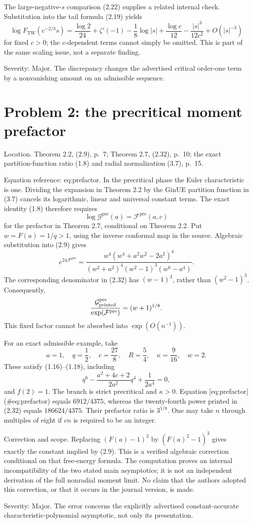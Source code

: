 \documentclass[10pt]{article}
\begin{document}
The large-negative-\(s\) comparison (2.22) supplies a related internal check. Substitution into the tail formula (2.19) yields \[\log F_{\mathrm{TW}}(c^{-2/3}s)
 =\frac{\log2}{24}+\zeta'(-1)-\frac18\log|s|
  +\frac{\log c}{12}-\frac{|s|^3}{12c^2}
  +O(|s|^{-3})\] for fixed \(c>0\); the \(c\)-dependent terms cannot simply be omitted. This is part of the same scaling issue, not a separate finding.\par
Severity: Major. The discrepancy changes the advertised critical order-one term by a nonvanishing amount on an admissible sequence.\par
\section*{Problem 2: the precritical moment prefactor}
Location. Theorem 2.2, (2.9), p. 7; Theorem 2.7, (2.32), p. 10; the exact partition-function ratio (1.8) and radial normalization (3.7), p. 15.\par
Equation reference: eq:prefactor. In the precritical phase the Euler characteristic is one. Dividing the expansion in Theorem 2.2 by the GinUE partition function in (3.7) cancels its logarithmic, linear and universal constant terms. The exact identity (1.8) therefore requires \[\log\mathcal G^{\mathrm{pre}}(a)=\mathcal F^{\mathrm{pre}}(a,c)\] for the prefactor in Theorem 2.7, conditional on Theorem 2.2. Put \(w=F(a)=1/q>1\), using the inverse conformal map in the source. Algebraic substitution into (2.9) gives \[
 e^{24\mathcal F^{\mathrm{pre}}}
 =\frac{w^4(w^4+a^2w^2-2a^2)^4}
 {(w^2+a^2)^4(w^2-1)^3(w^6-a^4)}.\] The corresponding denominator in (2.32) has \((w-1)^3\), rather than \((w^2-1)^3\). Consequently, \[\frac{\mathcal G^{\mathrm{pre}}_{\rm printed}}
      {\exp(\mathcal F^{\mathrm{pre}})}=(w+1)^{1/8}.\] This fixed factor cannot be absorbed into \(\exp(O(n^{-1}))\).\par
For an exact admissible example, take \[a=1,\quad q=\frac12,\quad c=\frac{27}{8},\quad
 R=\frac54,\quad \kappa=\frac9{16},\quad w=2 .\] These satisfy (1.16)–(1.18), including \[q^6-\frac{a^2+4c+2}{2a^2}q^4+\frac1{2a^4}=0,\] and \(f(2)=1\). The branch is strict precritical and \(\kappa>0\). Equation [eq:prefactor] (\#eq:prefactor) equals \(6912/4375\), whereas the twenty-fourth power printed in (2.32) equals \(186624/4375\). Their prefactor ratio is \(3^{1/8}\). One may take \(n\) through multiples of eight if \(cn\) is required to be an integer.\par
Correction and scope. Replacing \((F(a)-1)^3\) by \((F(a)^2-1)^3\) gives exactly the constant implied by (2.9). This is a verified algebraic correction conditional on that free-energy formula. The computation proves an internal incompatibility of the two stated main asymptotics; it is not an independent derivation of the full nonradial moment limit. No claim that the authors adopted this correction, or that it occurs in the journal version, is made.\par
Severity: Major. The error concerns the explicitly advertised constant-accurate characteristic-polynomial asymptotic, not only its presentation.\par
\end{document}
